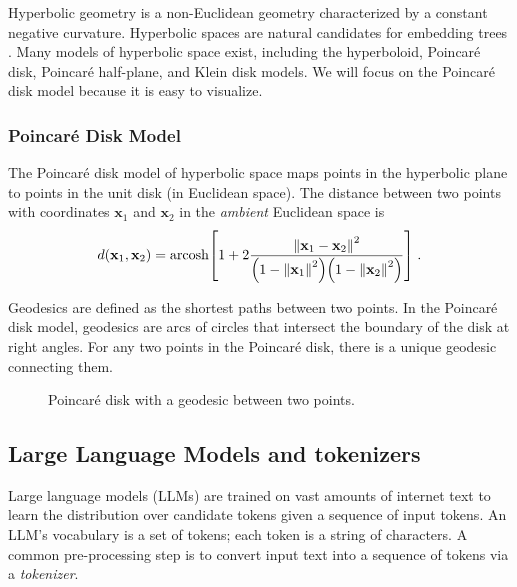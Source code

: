 \documentclass{article}
\begin{document}
Hyperbolic geometry is a non-Euclidean geometry characterized by a constant negative curvature. Hyperbolic spaces are natural candidates for embedding trees \cite{sarkar2011low}. Many models of hyperbolic space exist, including the hyperboloid, Poincaré disk, Poincaré half-plane, and Klein disk models. We will focus on the Poincaré disk model because it is easy to visualize.

\subsubsection{Poincaré Disk Model}

The Poincaré disk model of hyperbolic space maps points in the hyperbolic plane to points in the unit disk (in Euclidean space). The distance between two points with coordinates $\mathbf x_1$ and $\mathbf x_2$ in the \emph{ambient} Euclidean space is
\begin{align}
  d(\mathbf x_1, \mathbf x_2)
  = \text{arcosh} \qty[1 + 2 \frac{\norm{\mathbf x_1 - \mathbf x_2}^2}{\qty(1 - \norm{\mathbf x_1}^2) \qty(1 - \norm{\mathbf x_2}^2)}] \; . \label{eq:poincare-distance}
\end{align}

Geodesics are defined as the shortest paths between two points. In the Poincaré disk model, geodesics are arcs of circles that intersect the boundary of the disk at right angles. For any two points in the Poincaré disk, there is a unique geodesic connecting them.

\begin{figure}[h]
  \centering
  \caption{Poincaré disk with a geodesic between two points.}
  \label{fig:poincare-disk}
\end{figure}

\subsection{Large Language Models and tokenizers}

Large language models (LLMs) are trained on vast amounts of internet text to learn the distribution over candidate tokens given a sequence of input tokens. An LLM's vocabulary is a set of tokens; each token is a string of characters. A common pre-processing step is to convert input text into a sequence of tokens via a \emph{tokenizer}.
\end{document}
